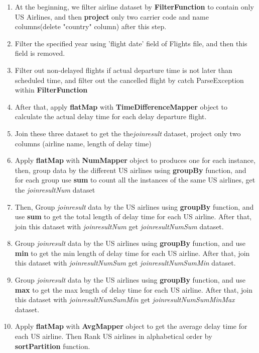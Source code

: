 \documentclass[12pt]{article}
\begin{document}
\begin{enumerate}
\item At the beginning, we filter airline dataset by \textbf{FilterFunction} to contain only US Airlines, and then \textbf{project} only two carrier code and name columns(delete "country" column) after this step.
\item Filter the specified year using 'flight date' field of Flights file, and then this field is removed. 
\item Filter out non-delayed flights if actual departure time is not later than scheduled time, and filter out the cancelled flight by catch ParseException within \textbf{FilterFunction}
\item After that, apply \textbf{flatMap} with \textbf{TimeDifferenceMapper} object to
calculate the actual delay time for each delay departure flight. 
\item Join these three dataset to get the the\textit{joinresult} dataset, project only two columns (airline name, length of delay time)

\item Apply \textbf{flatMap} with \textbf{NumMapper} object to produces one for each instance, then, group data by the different US airlines using \textbf{groupBy} function, and for each group use \textbf{sum} to count all the instances of the same US airlines, get the \textit{joinresultNum} dataset

\item Then, Group \textit{joinresult} data by the US airlines using \textbf{groupBy} function, and use \textbf{sum} to get the total length of delay time for each US airline. After that, join this dataset with \textit{joinresultNum} get \textit{joinresultNumSum} dataset. 

\item Group \textit{joinresult} data by the US airlines using \textbf{groupBy} function, and use \textbf{min} to get the min length of delay time for each US airline. After that, join this dataset with \textit{joinresultNumSum} get \textit{joinresultNumSumMin} dataset.

\item Group \textit{joinresult} data by the US airlines using \textbf{groupBy} function, and use \textbf{max} to get the max length of delay time for each US airline. After that, join this dataset with \textit{joinresultNumSumMin} get \textit{joinresultNumSumMinMax} dataset.

\item Apply \textbf{flatMap} with \textbf{AvgMapper} object to get the average delay time for each US airline. Then Rank US airlines in alphabetical order by \textbf{sortPartition} function.

\end{enumerate}
\end{document}
